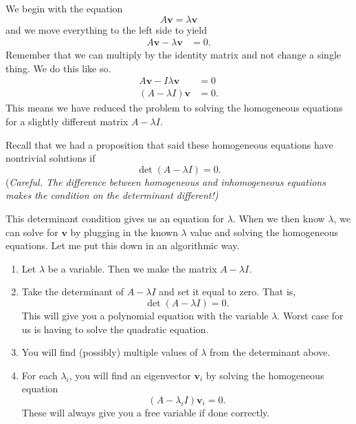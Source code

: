         We begin with the equation
        \[
        A\mathbf{v}=\lambda \mathbf{v}
        \]
        and we move everything to the left side to yield
        \begin{align*}
            A\mathbf{v}-\lambda \mathbf{v}&=0.
        \end{align*}
        Remember that we can multiply by the identity matrix and not change a single thing.  We do this like so.
        \begin{align*}
            A\mathbf{v}- I \lambda \mathbf{v}&=0\\
            (A-\lambda I)\mathbf{v}&=0.
        \end{align*}
        This means we have reduced the problem to solving the homogeneous equations for a slightly different matrix $A-\lambda I$.  
        
        Recall that we had a proposition that said these homogeneous equations have nontrivial solutions if 
        \[
        \det(A-\lambda I)=0.
        \]
        (\emph{Careful. The difference between homogeneous and inhomogeneous equations makes the condition on the determinant different!)}
        
        This determinant condition gives us an equation for $\lambda$. When we then know $\lambda$, we can solve for $\mathbf{v}$ by plugging in the known $\lambda$ value and solving the homogeneous equations. Let me put this down in an algorithmic way.
        
        \begin{enumerate}
            \item Let $\lambda$ be a variable.  Then we make the matrix $A-\lambda I$.
            \item Take the determinant of $A-\lambda I$ and set it equal to zero. That is,
            \[
            \det(A-\lambda I)=0.
            \]
            This will give you a polynomial equation with the variable $\lambda$.  Worst case for us is having to solve the quadratic equation.  
            \item You will find (possibly) multiple values of $\lambda$ from the determinant above.  
            \item For each $\lambda_i$, you will find an eigenvector $\mathbf{v}_i$ by solving the homogeneous equation
            \[
            (A-\lambda_i I)\mathbf{v}_i=0.
            \]
            These will always give you a free variable if done correctly.  
        \end{enumerate}
        
